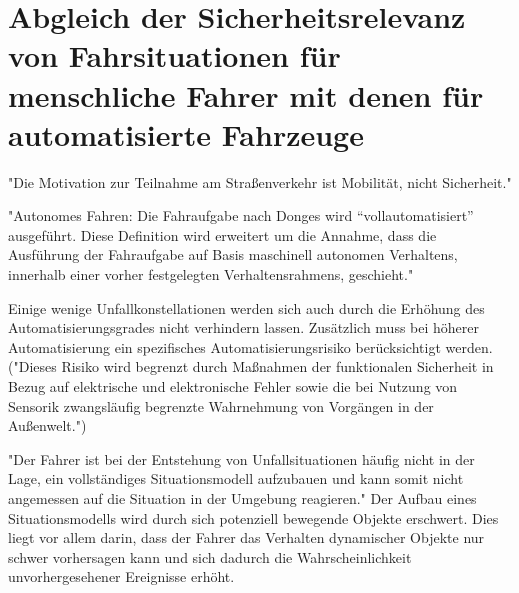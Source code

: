 
\chapter{Abgleich der Sicherheitsrelevanz von Fahrsituationen für menschliche Fahrer mit denen für automatisierte Fahrzeuge}\label{chapter:automatisiertes Fahren}

"Die Motivation zur Teilnahme am Straßenverkehr ist Mobilität, nicht Sicherheit." \parencite[S.146]{Huguenin.2017}



"Autonomes Fahren: Die Fahraufgabe nach Donges wird \enquote{vollautomatisiert} ausgeführt. Diese Definition wird erweitert um die Annahme, dass die Ausführung der Fahraufgabe auf Basis maschinell autonomen Verhaltens, innerhalb einer vorher festgelegten Verhaltensrahmens, geschieht." \parencite[S.34]{Maurer.2015}

Einige wenige Unfallkonstellationen werden sich auch durch die Erhöhung des Automatisierungsgrades nicht verhindern lassen. Zusätzlich muss bei höherer Automatisierung ein spezifisches Automatisierungsrisiko berücksichtigt werden. ("Dieses Risiko wird begrenzt durch Maßnahmen der funktionalen Sicherheit in Bezug auf elektrische und elektronische Fehler sowie die bei Nutzung von Sensorik zwangsläufig begrenzte Wahrnehmung von Vorgängen in der Außenwelt.") \parencite[S.5]{Gasser.2011}

"Der Fahrer ist bei der Entstehung von Unfallsituationen häufig nicht in der Lage, ein vollständiges Situationsmodell aufzubauen und kann somit nicht angemessen auf die Situation in der Umgebung reagieren." \parencite[S.48]{Zademach.24.09.2015} Der Aufbau eines Situationsmodells wird durch sich potenziell bewegende Objekte erschwert. Dies liegt vor allem darin, dass der Fahrer das Verhalten dynamischer Objekte nur schwer vorhersagen kann und sich dadurch die Wahrscheinlichkeit unvorhergesehener Ereignisse erhöht.

